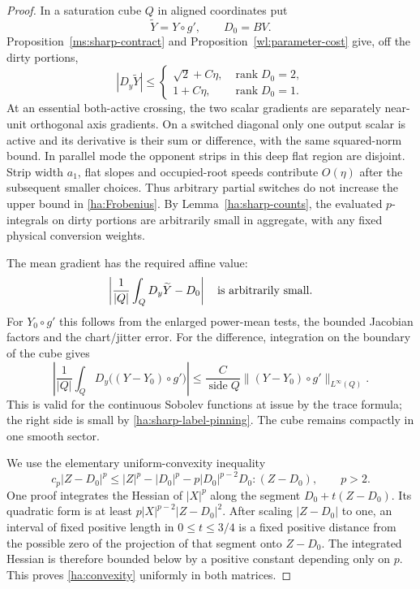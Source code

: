 \documentclass[11pt]{article}
\numberwithin{equation}{section}
\theoremstyle{definition}
\theoremstyle{remark}
\begin{document}
\begin{proof}
In a saturation cube $Q$ in aligned coordinates put
\[
                  \widetilde Y=Y\circ g',\qquad D_0=BV.
\]
Proposition~\ref{ms:sharp-contract} and
Proposition~\ref{wl:parameter-cost} give, off the dirty portions,
\begin{equation}\label{ha:Frobenius}
 |D_y\widetilde Y|\le
 \begin{cases}
   \sqrt2+C\eta,&\operatorname{rank} D_0=2,\\
   1+C\eta,&\operatorname{rank} D_0=1.
 \end{cases}
\end{equation}
At an essential both-active crossing, the two scalar gradients
are separately near-unit orthogonal axis gradients.  On a switched
diagonal only one output scalar is active and its derivative is
their sum or difference, with the same squared-norm bound.  In
parallel mode the opponent strips in this deep flat region are
disjoint.  Strip width $a_1$, flat slopes and occupied-root speeds
contribute $O(\eta)$ after the subsequent smaller choices.  Thus
arbitrary partial switches do not increase the upper bound in
\eqref{ha:Frobenius}.  By Lemma~\ref{ha:sharp-counts}, the evaluated
$p$-integrals on dirty portions are arbitrarily small in aggregate,
with any fixed physical conversion weights.

The mean gradient has the required affine value:
\begin{equation}\label{ha:mean-gradient}
                \left|\frac{1}{|Q|}\int_Q D_y\widetilde Y-D_0\right|
                      \quad\hbox{is arbitrarily small}.
\end{equation}
For $Y_0\circ g'$ this follows from the enlarged power-mean tests,
the bounded Jacobian factors and the chart/jitter error.  For the
difference, integration on the boundary of the cube gives
\[
 \left|\frac{1}{|Q|}\int_Q D_y\bigl((Y-Y_0)\circ g'\bigr)\right|
       \le \frac{C}{\operatorname{side}Q}
                       \|(Y-Y_0)\circ g'\|_{L^\infty(Q)}.
\]
This is valid for the continuous Sobolev functions at issue by
the trace formula; the right side is small by
\eqref{ha:sharp-label-pinning}.  The cube remains compactly in one
smooth sector.

We use the elementary uniform-convexity inequality
\begin{equation}\label{ha:convexity}
 c_p|Z-D_0|^p\le |Z|^p-|D_0|^p
             -p|D_0|^{p-2}D_0:(Z-D_0),\qquad p>2.
\end{equation}
One proof integrates the Hessian of $|X|^p$ along the segment
$D_0+t(Z-D_0)$.  Its quadratic form is at least
$p|X|^{p-2}|Z-D_0|^2$.  After scaling $|Z-D_0|$ to one, an interval
of fixed positive length in $0\le t\le3/4$ is a fixed positive
distance from the possible zero of the projection of that segment
onto $Z-D_0$.  The integrated Hessian is therefore bounded below
by a positive constant depending only on $p$.  This proves
\eqref{ha:convexity} uniformly in both matrices.


\end{proof}
\end{document}
